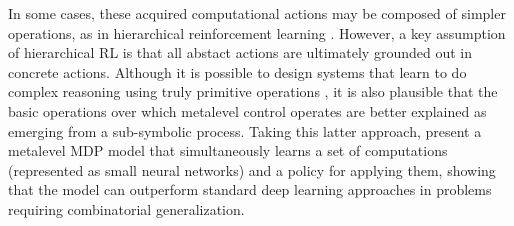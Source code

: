 In some cases, these acquired computational actions may be composed of simpler operations, as in hierarchical reinforcement learning \citep{sutton1999mdps,dietterich2000hierarchical,bacon2016optioncritic}. However, a key assumption of hierarchical RL is that all abstact actions are ultimately grounded out in concrete actions. Although it is possible to design systems that learn to do complex reasoning using truly primitive operations \citep{piantadosi2019logical}, it is also plausible that the basic operations over which metalevel control operates are better explained as emerging from a sub-symbolic process. Taking this latter approach, \citet{chang2019automatically} present a metalevel MDP model that simultaneously learns a set of computations (represented as small neural networks) and a policy for applying them, showing that the model can outperform standard deep learning approaches in problems requiring combinatorial generalization.






